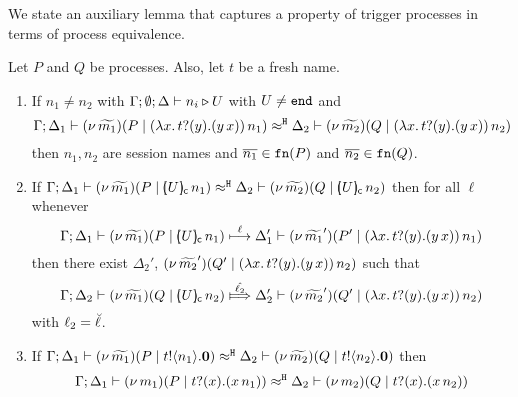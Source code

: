 
We state an auxiliary lemma that captures a property of trigger
processes in terms of process equivalence.
\begin{lemma}
	\label{lem:trigger_application}
	Let $P$ and $Q$ be processes. Also, let $t$ be a fresh name.
	\begin{enumerate}
		\item
			If $n_1 \not= n_2$ with $\Gamma; \emptyset; \Delta \vdash n_i \triangleright U$ with $U \not= \mathtt{end}$
			and
			\[
				\Gamma; \Delta_1 \vdash (\nu\, \widetilde{m_1})(P \;|\; (\lambda x.\,t ? (y) . (y\, {x}))\, {n_1} ) \approx^\mathtt{H} \Delta_2 \vdash (\nu\, \widetilde{m_2})(Q \;|\; (\lambda x.\,t ? (y) . (y\, {x}))\, {n_2} )
			\]
			then $n_1, n_2$ are session names and $\overline{n_1} \in \mathtt{fn}(P)$ and $\overline{n_2} \in \mathtt{fn}(Q)$.

		\item
			If
			$
				\horel{\Gamma}{\Delta_1}{\newsp{\widetilde{m_1}}{P \Par  \appl{\omapchar{U}}{n_1} }}%
				{\hwb}
				{\Delta_2}{\newsp{\widetilde{m_2}}{Q \Par \appl{\omapchar{U}}{n_2} }} %
			$
			then for all $\ell$ whenever
			\[
				\horel{\Gamma}{\Delta_1}{\newsp{\widetilde{m_1}}{P \Par \appl{\omapchar{U}}{n_1} }} %
				{\hby{\ell}}
				{\Delta_1'}{\newsp{\widetilde{m_1}'}{P' \Par \appl{(\trvalx{t})}{n_1} }}
			\]
			then there exist $\Delta_2'$, $(\nu\, \widetilde{m_2}')(Q' \;|\; (\lambda x.\,t ? (y) . (y\, {x}))\, {n_2} )$ such that
			\[
				\horel{\Gamma}{\Delta_2}{\newsp{\widetilde{m_1}}{Q \Par \appl{\omapchar{U}}{n_2} }} %
				{\Hby{\hat{\ell_2}}}
				{\Delta_2'}{\newsp{\widetilde{m_2}'}{Q' \Par \appl{(\trvalx{t})}{n_2} }} %
			\]
with $\ell_2 = \breve{\ell}$.
		\item
			If
			$
				\Gamma; \Delta_1 \vdash  (\nu\, \widetilde{m_1})(P \;|\; t ! \langle n_1 \rangle . \mathbf{0})  \approx^\mathtt{H} \Delta_2 \vdash  (\nu\, \widetilde{m_2})(Q \;|\; t ! \langle n_2 \rangle . \mathbf{0})
			$
			then
			\[
				\Gamma; \Delta_1 \vdash  (\nu\, m_1)(P \;|\; t ? (x) .{(x\, {n_1})})  \approx^\mathtt{H} \Delta_2 \vdash  (\nu\, m_2)(Q \;|\; t ? (x) .{(x\, {n_2})})
			\]


\end{enumerate}
\end{lemma}
